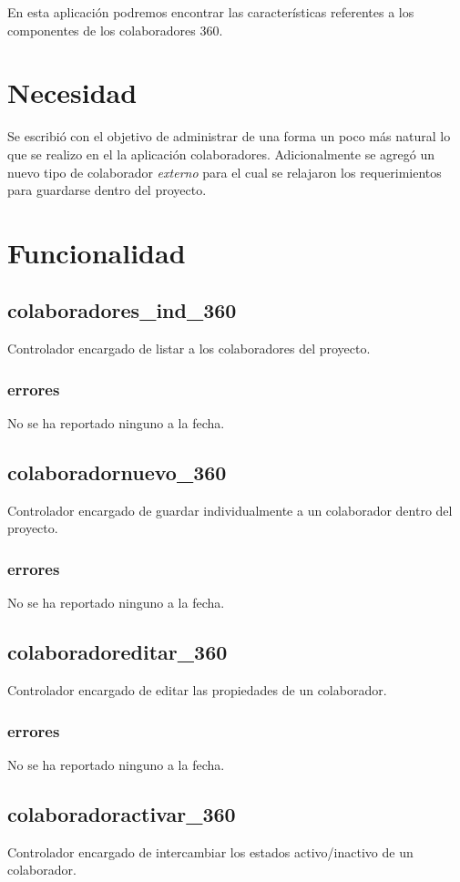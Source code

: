 \documentclass[10pt,a4paper]{book}
\begin{document}
	En esta aplicación podremos encontrar las características referentes a los componentes de los colaboradores 360.

	\section{Necesidad}

	Se escribió con el objetivo de administrar de una forma un poco más natural lo que se realizo en el la aplicación colaboradores. Adicionalmente se agregó un nuevo tipo de colaborador \textit{externo} para el cual se relajaron los requerimientos para guardarse dentro del proyecto.

	\section{Funcionalidad}


	\subsection{colaboradores\_ind\_360}
	Controlador encargado de listar a los colaboradores del proyecto.
	\subsubsection{errores}
	No se ha reportado ninguno a la fecha.

	\subsection{colaboradornuevo\_360}
	Controlador encargado de guardar individualmente a un colaborador dentro del proyecto.
	\subsubsection{errores}
	No se ha reportado ninguno a la fecha.

	\subsection{colaboradoreditar\_360}
	Controlador encargado de editar las propiedades de un colaborador.
	\subsubsection{errores}
	No se ha reportado ninguno a la fecha.

	\subsection{colaboradoractivar\_360}
	Controlador encargado de intercambiar los estados activo/inactivo de un colaborador.
\end{document}
